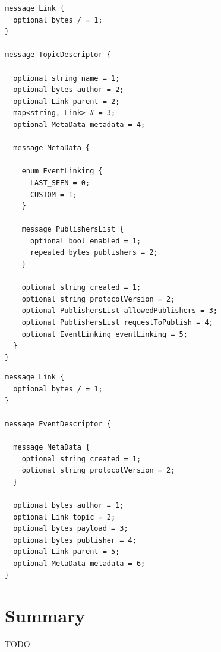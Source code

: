 \begin{lstlisting}[float, language=protobuf3,caption={Protobuf schema of the topic descriptor},label={proto-topic-descriptor}]
message Link {
  optional bytes / = 1;
}

message TopicDescriptor {

  optional string name = 1;
  optional bytes author = 2;
  optional Link parent = 2;
  map<string, Link> # = 3;
  optional MetaData metadata = 4;

  message MetaData {

    enum EventLinking {
      LAST_SEEN = 0;
      CUSTOM = 1;
    }

    message PublishersList {
      optional bool enabled = 1;
      repeated bytes publishers = 2;
    }

    optional string created = 1;
    optional string protocolVersion = 2;
    optional PublishersList allowedPublishers = 3;
    optional PublishersList requestToPublish = 4;
    optional EventLinking eventLinking = 5;
  }
}
\end{lstlisting}

\begin{lstlisting}[float, language=protobuf3,caption={Protobuf schema of the event descriptor},label={proto-event-descriptor}]
message Link {
  optional bytes / = 1;
}

message EventDescriptor {

  message MetaData {
    optional string created = 1;
    optional string protocolVersion = 2;
  }

  optional bytes author = 1;
  optional Link topic = 2;
  optional bytes payload = 3;
  optional bytes publisher = 4;
  optional Link parent = 5;
  optional MetaData metadata = 6;
}
\end{lstlisting}

\section{Summary}\label{summary}

TODO

